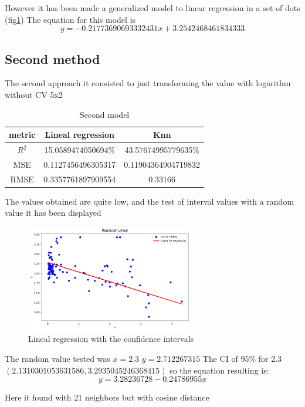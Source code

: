 \documentclass{article}
\begin{document}
However it has been made a generalized model to linear regression in a set of dots (fig\ref{fig:example_intervals})
The equation for this model is 
$$y=-0.21773690693332431x+3.2542468461834333$$
\subsection{Second method}
The second approach it consisted to just transforming the value with logarithm without CV 5x2
\begin{table}[H]
\begin{center}
  \begin{tabular}{|c|c|c|}
    \hline
     metric & Lineal regression & Knn \\ \hline
     $R^2$& 15.0589474050694\%&43.57674995779635\%\\
     MSE&0.1127456496305317&0.11904364904719832\\
     RMSE&0.3357761897909554&0.33166\\
     \hline
  \end{tabular}
  \caption{Second model}
\end{center}
\end{table}
The values obtained are quite low, and the test of interval values with a random value it has been displayed 
\begin{center}

\begin{figure}[h]
  \center
  \includegraphics[width=0.65\textwidth]{model_2.png}
  \caption{Lineal regression with the confidence intervals}
  \label{fig:example_intervals}
\end{figure}
\end{center}
The random value tested was $x=2.3$ $ y=2.712267315$
The CI of  95\% for 2.3 $(2.1310301053631586, 3.2935045246368415)$
so the equation resulting is: $$y=3.28236728 -0.24786955x $$

Here it found with 21 neighbors but with cosine distance
\end{document}
